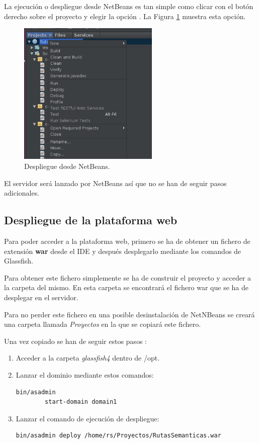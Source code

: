 La ejecución o despliegue desde NetBeans es tan simple como clicar con el botón derecho sobre el proyecto y elegir la opción . La Figura \ref{netbeansrun} muestra esta opción.

\begin{figure}[h]
  \centering
    \includegraphics[width=0.6\textwidth]{../img/glass/netbeansrun.jpg}
  \caption{Despliegue desde NetBeans.}
  \label{netbeansrun}
\end{figure}

El servidor será lanzado por NetBeans así que no se han de seguir pasos adicionales.

\subsection{Despliegue de la plataforma web}
Para poder acceder a la plataforma web, primero se ha de obtener un fichero de extensión \textbf{war} desde el IDE y después desplegarlo mediante los comandos de Glassfish.

Para obtener este fichero simplemente se ha de construir el proyecto y acceder a la carpeta  del mismo. En esta carpeta se encontrará el fichero war que se ha de desplegar en el servidor.

Para no perder este fichero en una posible desinstalación de NetNBeans se creará una carpeta llamada \textit{Proyectos} en la que se copiará este fichero.

Una vez copiado se han de seguir estos pasos \cite{auto:info}:

\begin{enumerate}
	\item Acceder a la carpeta \textit{glassfish4} dentro de /opt.
	\item Lanzar el dominio mediante estos comandos:
	\begin{lstlisting}[language=bash]
		bin/asadmin
		start-domain domain1		
	\end{lstlisting}
	\item Lanzar el comando de ejecución de despliegue:
	\begin{lstlisting}[language=bash]
		bin/asadmin deploy /home/rs/Proyectos/RutasSemanticas.war
	\end{lstlisting}
\end{enumerate}

